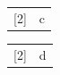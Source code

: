 \documentclass{article}
\begin{document}
\def\mymc#1{[#1]}
\renewcommand{\multicolumn}{\mymc}
\begin{tabular}{ll}
\multicolumn{2} & c \\
\end{tabular}
\makeatletter
\DeclareRobustCommand\multicolumn[1]{[#1]}
\makeatother
\begin{tabular}{ll}
\multicolumn{2} & d \\
\end{tabular}
\end{document}

